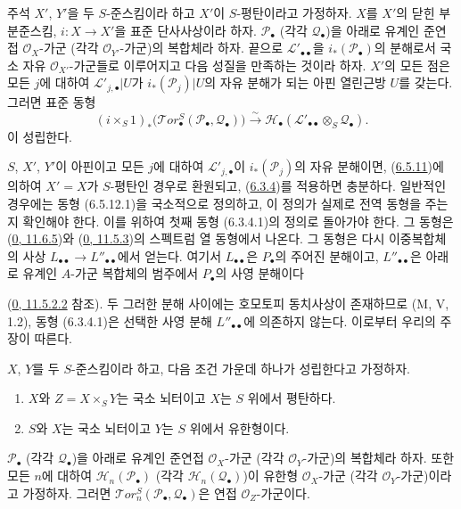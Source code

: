 \begin{namedtheorem}[6.5.12]{주석}
\label{III.6.5.12-fr}
$X'$, $Y'$을 두 $S$-준스킴이라 하고 $X'$이 $S$-평탄이라고 가정하자.
$X$를 $X'$의 닫힌 부분준스킴, $i:X\to X'$을 표준 단사사상이라 하자.
$\mathscr P_\bullet$ (각각 $\mathscr Q_\bullet$)을 아래로 유계인
준연접 $\mathscr O_X$-가군 (각각 $\mathscr O_{Y'}$-가군)의 복합체라
하자. 끝으로 $\mathscr L'_{\bullet\bullet}$을
$i_*(\mathscr P_\bullet)$의 분해로서 국소 자유 $\mathscr O_{X'}$-가군들로
이루어지고 다음 성질을 만족하는 것이라 하자. $X'$의 모든 점은 모든
$j$에 대하여 $\mathscr L'_{j,\bullet}|U$가
$i_*(\mathscr P_j)|U$의 자유 분해가 되는 아핀 열린근방 $U$를 갖는다.
그러면 표준 동형
\[
  (i\times_S 1)_*
  \bigl(\mathscr{T}\!or_\bullet^S
    (\mathscr P_\bullet,\mathscr Q_\bullet)\bigr)
  \xrightarrow{\sim}
  \mathscr H_\bullet
  (\mathscr L'_{\bullet\bullet}\otimes_S\mathscr Q_\bullet).
  \tag{6.5.12.1}\label{III.6.5.12.1.fr}
\]
이 성립한다.

$S$, $X'$, $Y'$이 아핀이고 모든 $j$에 대하여
$\mathscr L'_{j,\bullet}$이 $i_*(\mathscr P_j)$의 자유 분해이면,
(\hyperref[III.6.5.11-fr]{6.5.11})에 의하여 $X'=X$가 $S$-평탄인
경우로 환원되고, (\hyperref[III.6.3.4-fr]{6.3.4})를 적용하면 충분하다.
일반적인 경우에는 동형 (6.5.12.1)을 국소적으로 정의하고, 이 정의가
실제로 전역 동형을 주는지 확인해야 한다. 이를 위하여 첫째 동형
(6.3.4.1)의 정의로 돌아가야 한다. 그 동형은
(\hyperref[0.11.6.5-fr]{0, 11.6.5})와
(\hyperref[0.11.5.3-ko]{0, 11.5.3})의 스펙트럼 열 동형에서 나온다.
그 동형은 다시 이중복합체의 사상
$L_{\bullet\bullet}\to L''_{\bullet\bullet}$에서 얻는다. 여기서
$L_{\bullet\bullet}$은 $P_\bullet$의 주어진 분해이고,
$L''_{\bullet\bullet}$은 아래로 유계인 $A$-가군 복합체의 범주에서
$P_\bullet$의 사영 분해이다


(\hyperref[0.11.5.2.2-ko]{0, 11.5.2.2} 참조). 두 그러한 분해 사이에는
호모토피 동치사상이 존재하므로 (M, V, 1.2), 동형 (6.3.4.1)은 선택한
사영 분해 $L''_{\bullet\bullet}$에 의존하지 않는다. 이로부터 우리의
주장이 따른다.
\end{namedtheorem}

\begin{proposition}[6.5.13]
\label{III.6.5.13-fr}
$X$, $Y$를 두 $S$-준스킴이라 하고, 다음 조건 가운데 하나가
성립한다고 가정하자.
\begin{enumerate}
  \item[(i)] $X$와 $Z=X\times_S Y$는 국소 뇌터이고 $X$는 $S$ 위에서
    평탄하다.
  \item[(ii)] $S$와 $X$는 국소 뇌터이고 $Y$는 $S$ 위에서 유한형이다.
\end{enumerate}
$\mathscr P_\bullet$ (각각 $\mathscr Q_\bullet$)을 아래로 유계인
준연접 $\mathscr O_X$-가군 (각각 $\mathscr O_Y$-가군)의 복합체라
하자. 또한 모든 $n$에 대하여
$\mathscr H_n(\mathscr P_\bullet)$ (각각
$\mathscr H_n(\mathscr Q_\bullet)$)이 유한형 $\mathscr O_X$-가군
(각각 $\mathscr O_Y$-가군)이라고 가정하자. 그러면
$\mathscr{T}\!or_n^S(\mathscr P_\bullet,\mathscr Q_\bullet)$은
연접 $\mathscr O_Z$-가군이다.
\end{proposition}

